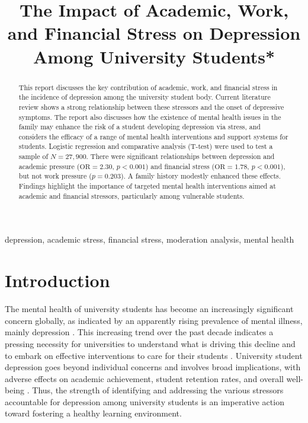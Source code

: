 \documentclass[conference]{IEEEtran}
\begin{document}
\title{The Impact of Academic, Work, and Financial Stress on Depression Among University Students*\\}

\author{
}

\maketitle

\begin{abstract}
This report discusses the key contribution of academic, work, and financial stress in the incidence of depression among the university student body. Current literature review shows a strong relationship between these stressors and the onset of depressive symptoms. The report also discusses how the existence of mental health issues in the family may enhance the risk of a student developing depression via stress, and considers the efficacy of a range of mental health interventions and support systems for students. Logistic regression and comparative analysis (T-test) were used to test a sample of $N = 27,900$. There were significant relationships between depression and academic pressure ($\mathrm{OR} = 2.30$, $p < 0.001$) and financial stress ($\mathrm{OR} = 1.78$, $p < 0.001$), but not work pressure ($p = 0.203$). A family history modestly enhanced these effects. Findings highlight the importance of targeted mental health interventions aimed at academic and financial stressors, particularly among vulnerable students.
\end{abstract}

\begin{IEEEkeywords}
depression, academic stress, financial stress, moderation analysis, mental health
\end{IEEEkeywords}

\section{Introduction}
The mental health of university students has become an increasingly significant concern globally, as indicated by an apparently rising prevalence of mental illness, mainly depression \cite{b1}. This increasing trend over the past decade indicates a pressing necessity for universities to understand what is driving this decline and to embark on effective interventions to care for their students \cite{b2}. University student depression goes beyond individual concerns and involves broad implications, with adverse effects on academic achievement, student retention rates, and overall well-being \cite{b3}. Thus, the strength of identifying and addressing the various stressors accountable for depression among university students is an imperative action toward fostering a healthy learning environment.  \\ 
\end{document}
